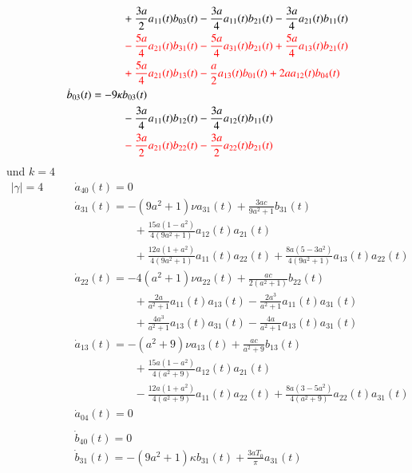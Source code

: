 \begin{refsection}
\begin{align*}
&\phantom{aaaaaaaaaa}
+
\frac{3 a}{2} a_{11}(t) b_{03}(t)
-
\frac{3 a}{4} a_{11}(t) b_{21}(t)
-
\frac{3 a}{4} a_{21}(t) b_{11}(t)
\\
&\phantom{aaaaaaaaaa}
\color{red}
-
\frac{5 a}{4} a_{21}(t) b_{31}(t)
-
\frac{5 a}{4} a_{31}(t) b_{21}(t)
+
\frac{5 a}{4} a_{13}(t) b_{21}(t)
\\
&\phantom{aaaaaaaaaa}
\color{red}
+
\frac{5 a}{4} a_{21}(t) b_{13}(t)
-
\frac{a}{2} a_{13}(t) b_{01}(t)
+
2 a
a_{12}(t) b_{04}(t)
\\
&
\dot{b}_{03}(t)
=
-
9
\kappa
b_{03}(t)
\\
&\phantom{aaaaaaaaaa}
-
\frac{3 a}{4} a_{11}(t) b_{12}(t)
-
\frac{3 a}{4} a_{12}(t) b_{11}(t)
\\
&\phantom{aaaaaaaaaa}
\color{red}
-
\frac{3 a}{2} a_{21}(t) b_{22}(t)
-
\frac{3 a}{2} a_{22}(t) b_{21}(t)
\end{align*}
und $k = 4$
\begin{align*}
|\gamma| = 4
\qquad &
\dot{a}_{40}(t) = 0
\\
&
\dot{a}_{31}(t)
=
-
(9 a^2+1)
\nu
a_{31}(t)
+
\frac{3 a c}{9 a^2+1} b_{31}(t)
\\
&\phantom{aaaaaaaaaa}
+
\frac{15 a (1 - a^2)}{4 (9 a^2+1)} a_{12}(t) a_{21}(t)
\\
&\phantom{aaaaaaaaaa}
+
\frac{12 a (1 + a^2)}{4 (9 a^2+1)} a_{11}(t) a_{22}(t)
+
\frac{8 a (5 - 3 a^2)}{4 (9 a^2+1)} a_{13}(t) a_{22}(t)
\\
&
\dot{a}_{22}(t)
=
-
4
(a^2+1)
\nu
a_{22}(t)
+
\frac{a c}{2 (a^2+1)} b_{22}(t)
\\
&\phantom{aaaaaaaaaa}
+
\frac{2 a}{a^2+1} a_{11}(t) a_{13}(t)
-
\frac{2 a^3}{a^2+1} a_{11}(t) a_{31}(t)
\\
&\phantom{aaaaaaaaaa}
+
\frac{4 a^3}{a^2+1} a_{13}(t) a_{31}(t)
-
\frac{4 a}{a^2+1} a_{13}(t) a_{31}(t)
\\
&
\dot{a}_{13}(t)
=
-
(a^2+9)
\nu
a_{13}(t)
+
\frac{a c}{a^2+9} b_{13}(t)
\\
&\phantom{aaaaaaaaaa}
+
\frac{15 a (1 - a^2)}{4 (a^2+9)} a_{12}(t) a_{21}(t)
\\
&\phantom{aaaaaaaaaa}
-
\frac{12 a (1 + a^2)}{4 (a^2+9)} a_{11}(t) a_{22}(t)
+
\frac{8 a (3 - 5 a^2)}{4 (a^2+9)} a_{22}(t) a_{31}(t)
\\
&
\dot{a}_{04}(t) = 0
\\
\\
&
\dot{b}_{40}(t) = 0
\\
&
\dot{b}_{31}(t)
=
-
(9 a^2+1)
\kappa
b_{31}(t)
+
\frac{3 a T_{0}}{\pi} a_{31}(t)
\\

\end{align*}
\end{refsection}
